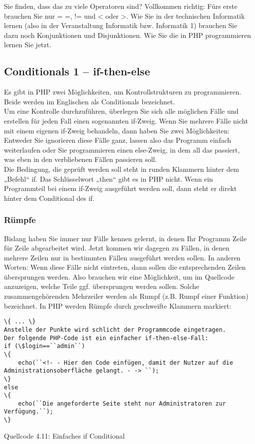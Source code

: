 Sie finden, dass das zu viele Operatoren sind? Vollkommen richtig: Fürs erste brauchen Sie nur = =, != und < oder >. Wie Sie in der technischen Informatik lernen (also in der Veranstaltung Informatik bzw. Informatik 1) brauchen Sie dazu noch Konjunktionen und Disjunktionen. Wie Sie die in PHP programmieren lernen Sie jetzt. 

\subsection{Conditionals 1 – if-then-else}

Es gibt in PHP zwei Möglichkeiten, um Kontrollstrukturen zu programmieren. Beide werden im Englischen als Conditionals bezeichnet.\\


Um eine Kontrolle durchzuführen, überlegen Sie sich alle möglichen Fälle und erstellen für jeden Fall einen sogenannten if-Zweig. Wenn Sie mehrere Fälle nicht mit einem eigenen if-Zweig behandeln, dann haben Sie zwei Möglichkeiten: Entweder Sie ignorieren diese Fälle ganz, lassen also das Programm einfach weiterlaufen oder Sie programmieren einen else-Zweig, in dem all das passiert, was eben in den verbliebenen Fällen passieren soll.\\


Die Bedingung, die geprüft werden soll steht in runden Klammern hinter dem „Befehl“ if. Das Schlüsselwort „then“ gibt es in PHP nicht. Wenn ein Programmteil bei einem if-Zweig ausgeführt werden soll, dann steht er direkt hinter dem Conditional des if.

\subsubsection{Rümpfe}

Bislang haben Sie immer nur Fälle kennen gelernt, in denen Ihr Programm Zeile für Zeile abgearbeitet wird. Jetzt kommen wir dagegen zu Fällen, in denen mehrere Zeilen nur in bestimmten Fällen ausgeführt werden sollen. In anderen Worten: Wenn diese Fälle nicht eintreten, dann sollen die entsprechenden Zeilen übersprungen werden. Also brauchen wir eine Möglichkeit, um im Quellcode anzuzeigen, welche Teile ggf. übersprungen werden sollen. Solche zusammengehörenden Mehrzeiler werden als Rumpf (z.B. Rumpf einer Funktion) bezeichnet. In PHP werden Rümpfe durch geschweifte Klammern markiert: \\

\begin{verbatim}
\{ ... \}
Anstelle der Punkte wird schlicht der Programmcode eingetragen.
Der folgende PHP-Code ist ein einfacher if-then-else-Fall:
if (\$login==``admin``)
\{
	echo(``<!- - Hier den Code einfügen, damit der Nutzer auf die Administrationsoberfläche gelangt. - -> ``);
\}
else 
\{
	echo(``Die angeforderte Seite steht nur Administratoren zur Verfügung.``);
\}
\end{verbatim}
Quellcode 4.11: Einfaches if Conditional

